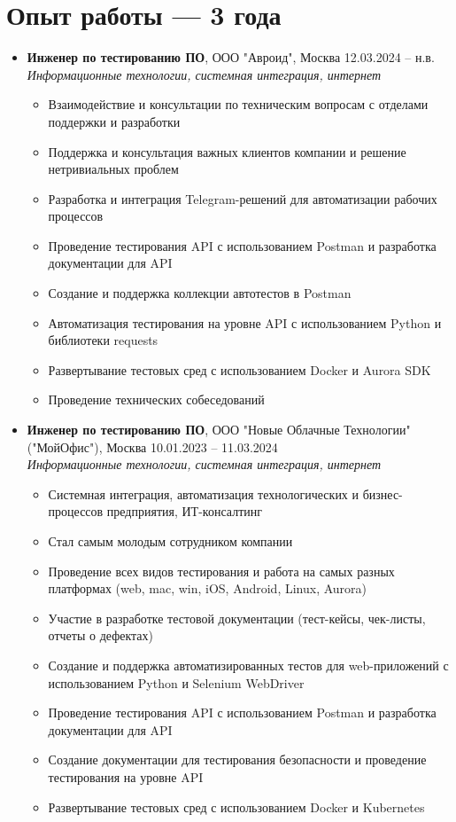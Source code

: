 \documentclass[a4paper,11pt]{article}
\begin{document}
\section{Опыт работы — 3 года}
\begin{itemize}[leftmargin=*]
  \item \textbf{Инженер по тестированию ПО}, ООО "Авроид", Москва \hfill 12.03.2024 -- н.в.\\
  \textit{Информационные технологии, системная интеграция, интернет}
  \begin{itemize}
    \item Взаимодействие и консультации по техническим вопросам с отделами поддержки и разработки
    \item Поддержка и консультация важных клиентов компании и решение нетривиальных проблем
    \item Разработка и интеграция Telegram-решений для автоматизации рабочих процессов
    \item Проведение тестирования API с использованием Postman и разработка документации для API
    \item Создание и поддержка коллекции автотестов в Postman
    \item Автоматизация тестирования на уровне API с использованием Python и библиотеки requests
    \item Развертывание тестовых сред с использованием Docker и Aurora SDK
    \item Проведение технических собеседований
  \end{itemize}

  \item \textbf{Инженер по тестированию ПО}, ООО "Новые Облачные Технологии" ("МойОфис"), Москва \hfill 10.01.2023 -- 11.03.2024\\
  \textit{Информационные технологии, системная интеграция, интернет}
  \begin{itemize}
    \item Системная интеграция, автоматизация технологических и бизнес-процессов предприятия, ИТ-консалтинг
    \item Стал самым молодым сотрудником компании
    \item Проведение всех видов тестирования и работа на самых разных платформах (web, mac, win, iOS, Android, Linux, Aurora)
    \item Участие в разработке тестовой документации (тест-кейсы, чек-листы, отчеты о дефектах)
    \item Создание и поддержка автоматизированных тестов для web-приложений с использованием Python и Selenium WebDriver
    \item Проведение тестирования API с использованием Postman и разработка документации для API
    \item Создание документации для тестирования безопасности и проведение тестирования на уровне API
    \item Развертывание тестовых сред с использованием Docker и Kubernetes
  \end{itemize}


\end{itemize}
\end{document}
